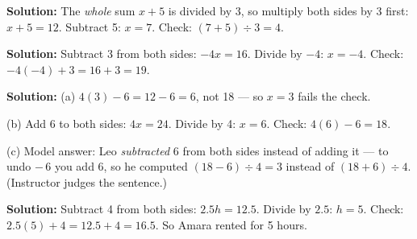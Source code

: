 \documentclass[12pt]{article}
\begin{document}

\textbf{Solution:} The \emph{whole} sum $x + 5$ is divided by 3, so multiply both
sides by 3 first: $x + 5 = 12$. Subtract 5: $x = 7$.
Check: $(7 + 5) \div 3 = 4$. \checkmark {}


\textbf{Solution:} Subtract 3 from both sides: $-4x = 16$. Divide by $-4$:
$x = -4$. Check: $-4(-4) + 3 = 16 + 3 = 19$. \checkmark {}


\textbf{Solution:} (a) $4(3) - 6 = 12 - 6 = 6$, not 18 --- so $x = 3$ fails the
check. 

(b) Add 6 to both sides: $4x = 24$. Divide by 4: $x = 6$.
Check: $4(6) - 6 = 18$. \checkmark {}

(c) Model answer: Leo \emph{subtracted} 6 from both sides instead of adding it ---
to undo $-\,6$ you add 6, so he computed $(18 - 6) \div 4 = 3$ instead of
$(18 + 6) \div 4$. (Instructor judges the sentence.)


\textbf{Solution:} Subtract 4 from both sides: $2.5h = 12.5$. Divide by $2.5$:
$h = 5$. Check: $2.5(5) + 4 = 12.5 + 4 = 16.5$. \checkmark So Amara rented for 5
hours. 
\end{document}
